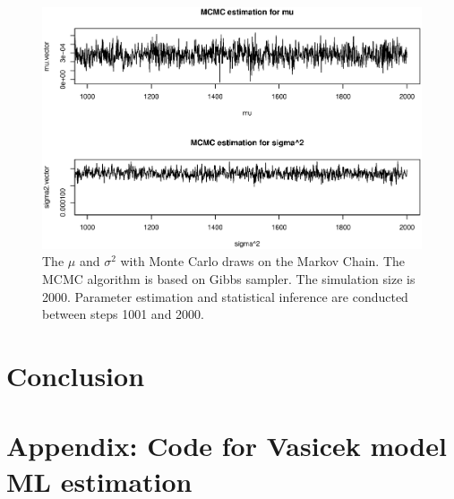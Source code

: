 \documentclass[11pt,reqno,final]{amsart}
\begin{document}
\begin{figure}
  \centering
  \includegraphics[scale=0.6]{mu_sigma_bs.eps}
  \caption{The $\mu$ and $\sigma^2$ with Monte Carlo draws on the Markov Chain. The MCMC algorithm is based on Gibbs sampler. The simulation size is 2000. Parameter estimation and statistical inference are conducted between steps 1001 and 2000.}\label{mu_sigma_bs}
\end{figure}

\section{Conclusion}



%
%
\newpage


%
%
\newpage
\section*{Appendix: Code for Vasicek model ML estimation}

\end{document}
